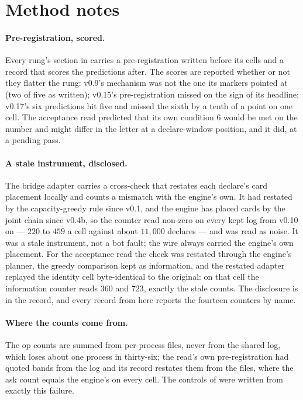 \documentclass[11pt]{article}
\begin{document}
\section{Method notes}
\label{sec:method}

\paragraph{Pre-registration, scored.} Every rung's section in \cite{monet} carries a
pre-registration written before its cells and a record that scores the predictions after. The scores
are reported whether or not they flatter the rung: v0.9's mechanism was not the one its markers
pointed at (two of five as written); v0.15's pre-registration missed on the sign of its headline;
v0.17's six predictions hit five and missed the sixth by a tenth of a point on one cell. The
acceptance read predicted that its own condition 6 would be met on the number and might differ in
the letter at a declare-window position, and it did, at a pending pass.

\paragraph{A stale instrument, disclosed.} The bridge adapter carries a cross-check that restates
each declare's card placement locally and counts a mismatch with the engine's own. It had restated
by the capacity-greedy rule since v0.1, and the engine has placed cards by the joint chain since
v0.4b, so the counter read non-zero on every kept log from v0.10 on --- $220$ to $459$ a cell against
about $11{,}000$ declares --- and was read as noise. It was a stale instrument, not a bot fault; the
wire always carried the engine's own placement. For the acceptance read the check was restated
through the engine's planner, the greedy comparison kept as information, and the restated adapter
replayed the identity cell byte-identical to the original: on that cell the information counter
reads $360$ and $723$, exactly the stale counts. The disclosure is in the record, and every record
from here reports the fourteen counters by name.

\paragraph{Where the counts come from.} The op counts are summed from per-process files, never from
the shared log, which loses about one process in thirty-six; the read's own pre-registration had
quoted bands from the log and its record restates them from the files, where the ask count equals the
engine's on every cell. The controls of \cite{frontier} were written from exactly this failure.
\end{document}
